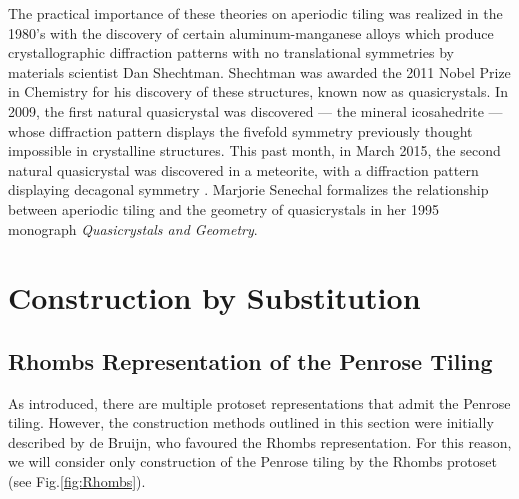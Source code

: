 \documentclass[
  oneside,
  11pt, a4paper,
  footinclude=true,
  headinclude=true,
  cleardoublepage=empty
]{scrbook}
\begin{document}
The practical importance of these theories on aperiodic tiling was realized in the 1980's with the discovery of certain aluminum-manganese alloys which produce crystallographic diffraction patterns with no translational symmetries by materials scientist Dan Shechtman. Shechtman was awarded the 2011 Nobel Prize in Chemistry for his discovery of these structures, known now as quasicrystals. In 2009, the first natural quasicrystal was discovered --- the mineral icosahedrite --- whose diffraction pattern displays the fivefold symmetry previously thought impossible in crystalline structures. This past month, in March 2015, the second natural quasicrystal was discovered in a meteorite, with a diffraction pattern displaying decagonal symmetry \cite{Bindi2015}. Marjorie Senechal formalizes the relationship between aperiodic tiling and the geometry of quasicrystals in her 1995 monograph \textit{Quasicrystals and Geometry}. 


\chapter{Construction by Substitution}

\section{Rhombs Representation of the Penrose Tiling} %
As introduced, there are multiple protoset representations that admit the Penrose tiling. However, the construction methods outlined in this section were initially described by de Bruijn, who favoured the Rhombs representation.  For this reason, we will consider only construction of the Penrose tiling by the Rhombs protoset (see Fig.\ref{fig:Rhombs}). 
\end{document}
